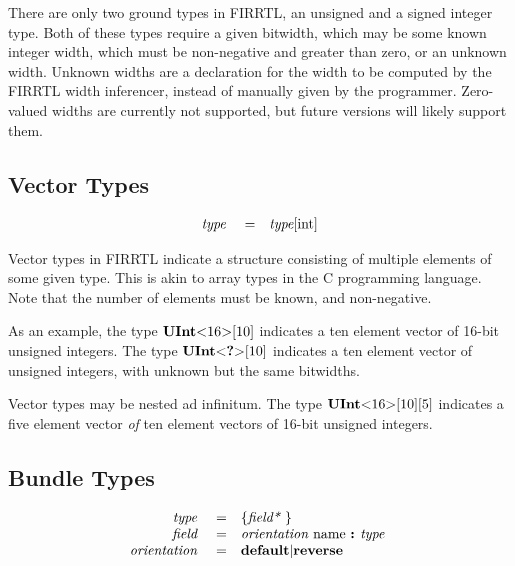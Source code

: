\documentclass[10pt]{article}
\begin{document}
There are only two ground types in FIRRTL, an unsigned and a signed integer type.
Both of these types require a given bitwidth, which may be some known integer width, which must be non-negative and greater than zero, or an unknown width.
Unknown widths are a declaration for the width to be computed by the FIRRTL width inferencer, instead of manually given by the programmer.
Zero-valued widths are currently not supported, but future versions will likely support them.

\subsection{Vector Types}
\[
\begin{array}{rrl}
\text{\em type\ }       &=     &\text{\em type}[\text{int}]           \\
\end{array}
\]

Vector types in FIRRTL indicate a structure consisting of multiple elements of some given type.
This is akin to array types in the C programming language.
Note that the number of elements must be known, and non-negative.

As an example, the type $\text{\bf UInt}\text{\bf $<$} 16 \text{\bf $>$}[10]$ indicates a ten element vector of 16-bit unsigned integers.
The type $\text{\bf UInt}\text{\bf $<$} \text{\bf ?} \text{\bf $>$}[10]$ indicates a ten element vector of unsigned integers, with unknown but the same bitwidths.

Vector types may be nested ad infinitum.
The type $\text{\bf UInt}\text{\bf $<$} 16 \text{\bf $>$}[10][5]$ indicates a five element vector {\em of} ten element vectors of 16-bit unsigned integers.

\subsection{Bundle Types}
\[
\begin{array}{rrl}
\text{\em type\ }       &=     &\{\text{\em field*\ }\}                         \\
\text{\em field\ }      &=     &\text{\em orientation\ } \text{name } \text{\bf :\ } \text{\em type\ }        \\
\text{\em orientation\ }&=     &\text{\bf default} \vert \text{\bf reverse}    \\ 
\end{array}
\]
\end{document}
